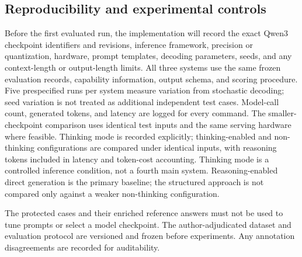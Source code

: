 \documentclass[10pt,conference]{IEEEtran}
\begin{document}
\subsection{Reproducibility and experimental controls}
Before the first evaluated run, the implementation will record the exact Qwen3 checkpoint identifiers and revisions, inference framework, precision or quantization, hardware, prompt templates, decoding parameters, seeds, and any context-length or output-length limits. All three systems use the same frozen evaluation records, capability information, output schema, and scoring procedure. Five prespecified runs per system measure variation from stochastic decoding; seed variation is not treated as additional independent test cases. Model-call count, generated tokens, and latency are logged for every command. The smaller-checkpoint comparison uses identical test inputs and the same serving hardware where feasible. Thinking mode is recorded explicitly; thinking-enabled and non-thinking configurations are compared under identical inputs, with reasoning tokens included in latency and token-cost accounting. Thinking mode is a controlled inference condition, not a fourth main system. Reasoning-enabled direct generation is the primary baseline; the structured approach is not compared only against a weaker non-thinking configuration.

The protected cases and their enriched reference answers must not be used to tune prompts or select a model checkpoint. The author-adjudicated dataset and evaluation protocol are versioned and frozen before experiments. Any annotation disagreements are recorded for auditability.
\end{document}
